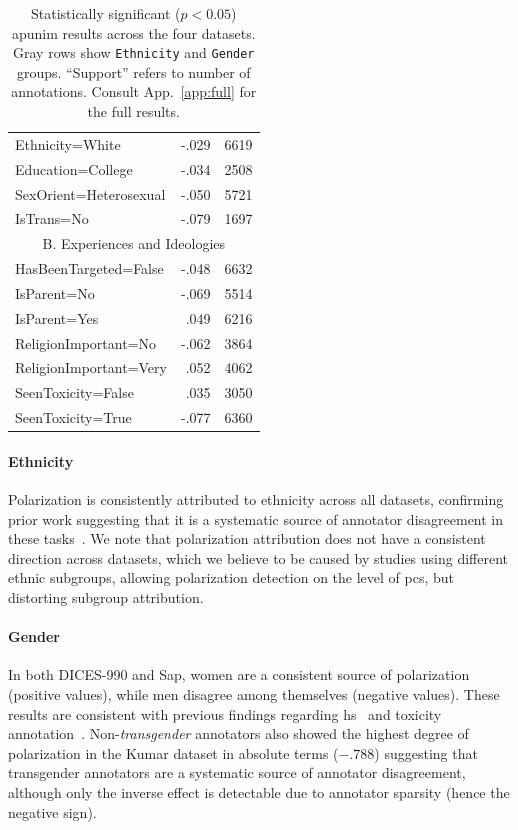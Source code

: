 \documentclass{article} %
\theoremstyle{definition}
\theoremstyle{plain}
\begin{document}
\begin{table}[t]
\begin{minipage}[t]{0.485\textwidth}
\begin{tabularx}{\linewidth}{X r r}
			Ethnicity=White & -.029 & 6619 \\
			Education=College & -.034 & 2508 \\
			SexOrient=Heterosexual & -.050 & 5721 \\
			\rowcolor{gray!15}
			IsTrans=No & -.079 & 1697 \\
			\midrule
			\multicolumn{3}{c}{B. Experiences and Ideologies} \\
			\midrule
			HasBeenTargeted=False & -.048 & 6632 \\
			IsParent=No & -.069 & 5514 \\
			IsParent=Yes & .049 & 6216 \\
			ReligionImportant=No & -.062 & 3864 \\
			ReligionImportant=Very & .052 & 4062 \\
			SeenToxicity=False & .035 & 3050 \\
			SeenToxicity=True & -.077 & 6360 \\
			\bottomrule
		\end{tabularx}
	\end{minipage}
	\caption{Statistically significant ($p<0.05$) apunim results across the four datasets. Gray rows show \texttt{Ethnicity} and \texttt{Gender} groups. ``Support'' refers to number of annotations. Consult App.~\ref{app:full} for the full results.}
	\label{tab:merged-apunim}
\end{table}

\paragraph{Ethnicity} Polarization is consistently attributed to ethnicity across all datasets, confirming prior work suggesting that it is a systematic source of annotator disagreement in these tasks~\cite{goyal2022your}. We note that polarization attribution does not have a consistent direction across datasets, which we believe to be caused by studies using different ethnic subgroups, allowing polarization detection on the level of \acp{pc}, but distorting subgroup attribution.

\paragraph{Gender} In both DICES-990 and Sap, women are a consistent source of polarization (positive values), while men disagree among themselves (negative values). These results are consistent with previous findings regarding \ac{hs}~\citep{wojatzki2018women} and toxicity annotation~\cite{binns2017like}. Non-\emph{transgender} annotators also showed the highest degree of polarization in the Kumar dataset in absolute terms ($-.788$) suggesting that transgender annotators are a systematic source of annotator disagreement, although only the inverse effect is detectable due to annotator sparsity (hence the negative sign).
\end{document}
